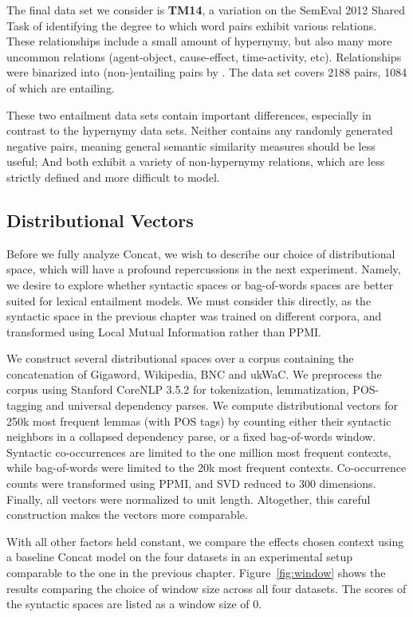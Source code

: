The final data set we consider is {\bf TM14}, a variation on the SemEval 2012
Shared Task of identifying the degree to which word pairs exhibit various
relations. These relationships include a small amount of hypernymy, but also
many more uncommon relations (agent-object, cause-effect, time-activity, etc).
Relationships were binarized into (non-)entailing pairs by
.  The data set covers 2188 pairs, 1084 of which are
entailing.

These two entailment data sets contain important differences, especially in
contrast to the hypernymy data sets. Neither contains any randomly generated
negative pairs, meaning general semantic similarity measures should be less
useful; And both exhibit a variety of non-hypernymy relations, which are less
strictly defined and more difficult to model.

\subsection{Distributional Vectors}

Before we fully analyze Concat, we wish to
describe our choice of distributional space, which will have a profound
repercussions in the next experiment. Namely, we desire to explore whether
syntactic spaces or bag-of-words spaces are better suited for lexical
entailment models. We must consider this directly, as the syntactic space in
the previous chapter was trained on different corpora, and transformed using
Local Mutual Information \cite{evert:2005:phd} rather than PPMI.

We construct several distributional spaces over a corpus containing the
concatenation of Gigaword, Wikipedia, BNC and ukWaC.  We preprocess the corpus
using Stanford CoreNLP 3.5.2 \cite{chen:2014:emnlp} for tokenization,
lemmatization, POS-tagging and universal dependency parses. We compute
distributional vectors for 250k most frequent lemmas (with POS tags) by
counting either their syntactic neighbors in a collapsed dependency parse, or a
fixed bag-of-words window. Syntactic co-occurrences are limited to the one
million most frequent contexts, while bag-of-words were limited to the 20k most
frequent contexts. Co-occurrence counts were transformed using PPMI, and SVD
reduced to 300 dimensions. Finally, all vectors were normalized to unit length.
Altogether, this careful construction makes the vectors more comparable.

With all other factors held constant, we compare the effects chosen context
using a baseline Concat model \cite{weeds:2014:coling} on the four datasets in
an experimental setup comparable to the one in the previous chapter.
Figure~\ref{fig:window} shows the results comparing the choice of window
size across all four datasets. The scores of the syntactic spaces are listed
as a window size of 0.

